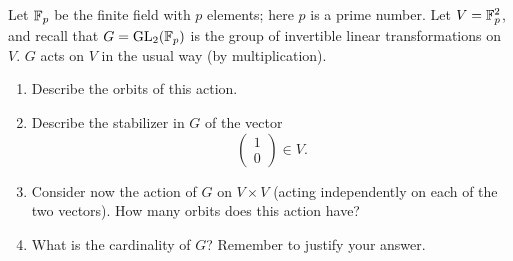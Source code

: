 \begin{question}[subtitle = August 2022 Problem 2,ID=Aug22_2]
Let $\mathbb{F}_p$ be the finite field with $p$ elements; here $p$ is a prime number. Let $V = \mathbb{F}_p^2$, and recall that $G = \operatorname{GL}_2(\mathbb{F}_p)$ is the group of invertible linear transformations on $V$. $G$ acts on $V$ in the usual way (by multiplication).
\begin{enumerate}
    \item Describe the orbits of this action.
    \item Describe the stabilizer in $G$ of the vector
    \[\begin{pmatrix} 1 \\ 0 \end{pmatrix} \in V.\]
    \item Consider now the action of $G$ on $V \times V$ (acting independently on each of the two vectors). How many orbits does this action have?
    \item What is the cardinality of $G$? Remember to justify your answer.
\end{enumerate}
\end{question}
